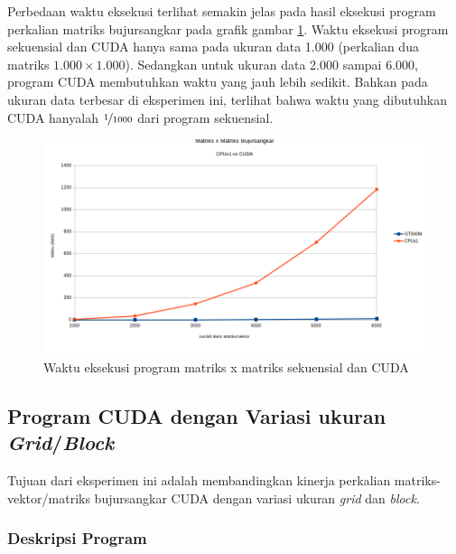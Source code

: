 Perbedaan waktu eksekusi terlihat semakin jelas pada hasil eksekusi program perkalian matriks bujursangkar pada grafik gambar \ref{fig:seq_cuda_mm_940}. Waktu eksekusi program sekuensial dan CUDA hanya sama pada ukuran data 1.000 (perkalian dua matriks $1.000 \times 1.000$). Sedangkan untuk ukuran data 2.000 sampai 6.000, program CUDA membutuhkan waktu yang jauh lebih sedikit. Bahkan pada ukuran data terbesar di eksperimen ini, terlihat bahwa waktu yang dibutuhkan CUDA hanyalah $\nicefrac{1}{1000}$ dari program sekuensial.

\begin{figure}
	\centering
	\includegraphics[width=1\textwidth]
	{pics/seq_cuda_mm_940}
	\caption{Waktu eksekusi program matriks x matriks sekuensial dan CUDA}
	\label{fig:seq_cuda_mm_940}
\end{figure}  

\subsection{Program CUDA dengan Variasi ukuran \textit{Grid}/\textit{Block}} 

Tujuan dari eksperimen ini adalah membandingkan kinerja perkalian matriks-vektor/matriks bujursangkar CUDA dengan variasi ukuran \textit{grid} dan \textit{block}.

\subsubsection{Deskripsi Program}

